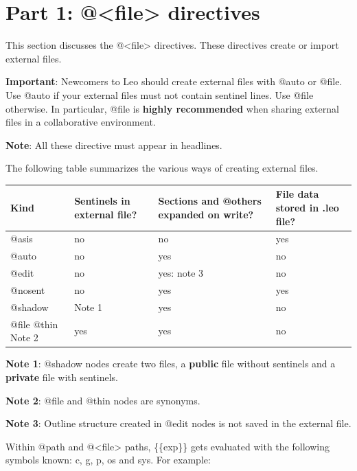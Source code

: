 \documentclass[a4paper,10pt,english]{sphinxmanual}
\begin{document}
\section{Part 1: @\textless{}file\textgreater{} directives}
\label{directives:part-1-file-directives}
This section discusses the @\textless{}file\textgreater{} directives. These directives create or
import external files.

\textbf{Important}: Newcomers to Leo should create external files with @auto or
@file. Use @auto if your external files must not contain sentinel lines. Use
@file otherwise. In particular, @file is \textbf{highly recommended} when sharing
external files in a collaborative environment.

\textbf{Note}: All these directive must appear in headlines.

The following table summarizes the various ways of creating external files.

\begin{tabulary}{\linewidth}{|L|L|L|L|}
\hline

Kind
 & 
Sentinels
in external
file?
 & 
Sections and
@others expanded
on write?
 & 
File data stored
in .leo file?
\\\hline

@asis
 & 
no
 & 
no
 & 
yes
\\\hline

@auto
 & 
no
 & 
yes
 & 
no
\\\hline

@edit
 & 
no
 & 
yes: note 3
 & 
no
\\\hline

@nosent
 & 
no
 & 
yes
 & 
yes
\\\hline

@shadow
 & 
Note 1
 & 
yes
 & 
no
\\\hline

@file
@thin
Note 2
 & 
yes
 & 
yes
 & 
no
\\\hline
\end{tabulary}


\textbf{Note 1}: @shadow nodes create two files, a \textbf{public} file without sentinels
and a \textbf{private} file with sentinels.

\textbf{Note 2}: @file and @thin nodes are synonyms.

\textbf{Note 3}: Outline structure created in @edit nodes is not saved in the
external file.

Within @path and @\textless{}file\textgreater{} paths, \{\{exp\}\} gets evaluated with the following
symbols known: c, g, p, os and sys.  For example:
\end{document}
